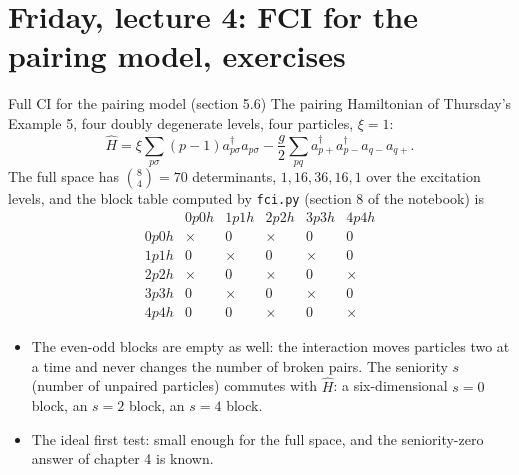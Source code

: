 \documentclass[aspectratio=169,10pt]{beamer}
\begin{document}
\section{Friday, lecture 4: FCI for the pairing model, exercises}

\begin{frame}{Full CI for the pairing model (section 5.6)}
  \small
  The pairing Hamiltonian of Thursday's Example 5, four doubly degenerate levels, four particles, $\xi=1$:
  \[
    \hat{H}=\xi\sum_{p\sigma}(p-1)a^{\dagger}_{p\sigma}a_{p\sigma}
    -\frac{g}{2}\sum_{pq}a^{\dagger}_{p+}a^{\dagger}_{p-}a_{q-}a_{q+}.
  \]
  The full space has $\binom84=70$ determinants, $1,16,36,16,1$ over the excitation levels, and the block table computed by \texttt{fci.py} (section 8 of the notebook) is
  \[
    \begin{array}{c|ccccc}
       & 0p0h & 1p1h & 2p2h & 3p3h & 4p4h\\
      \hline
      0p0h & \times & 0 & \times & 0 & 0\\
      1p1h & 0 & \times & 0 & \times & 0\\
      2p2h & \times & 0 & \times & 0 & \times\\
      3p3h & 0 & \times & 0 & \times & 0\\
      4p4h & 0 & 0 & \times & 0 & \times
    \end{array}
  \]
  \begin{itemize}
    \item The even-odd blocks are empty as well: the interaction moves particles two at a time and never changes the number of broken pairs. The \alert{seniority} $s$ (number of unpaired particles) commutes with $\hat{H}$: a six-dimensional $s=0$ block, an $s=2$ block, an $s=4$ block.
    \item The ideal first test: small enough for the full space, and the seniority-zero answer of chapter 4 is known.
  \end{itemize}
\end{frame}
\end{document}

